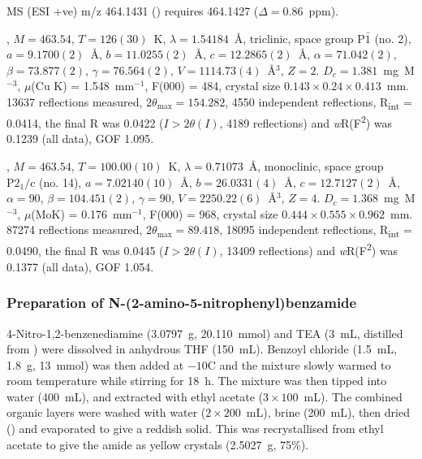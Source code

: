 \begin{refsection}
MS (ESI +ve) m/z 464.1431 ()  requires 464.1427 ($\Delta=0.86$~ppm).

, $M=463.54$, $T=126(30)$~K, $\lambda=1.54184$~\AA, triclinic, space group $\text{P}\bar{1}$ (no. 2), $a = 9.1700(2)$~\AA, $b = 11.0255(2)$~\AA, $c = 12.2865(2)$~\AA, $\alpha = 71.042(2)$\degree, $\beta = 73.877(2)$\degree, $\gamma = 76.564(2)$\degree, $V = 1114.73(4)$~\AA$^{3}$, $Z = 2$. $D_{c}= 1.381$~mg~M$^{-3}$, $\mu$(Cu K\a) = 1.548~mm$^{-1}$, F(000) = 484, crystal size $0.143 \times 0.24 \times 0.413$~mm. 13637 reflections measured, $2\theta_{\mathrm{max}}=154.282$\degree, 4550 independent reflections, R\textsubscript{int} = 0.0414, the final R was 0.0422 ($I > 2\theta(I)$, 4189 reflections) and \emph{w}R(F\textsuperscript{2}) was 0.1239 (all data), GOF 1.095. 

, $M=463.54$, $T=100.00(10)$~K, $\lambda=0.71073$~\AA, monoclinic, space group $\text{P}2_1/\text{c}$ (no. 14), $a = 7.02140(10)$~\AA, $b = 26.0331(4)$~\AA, $c = 12.7127(2)$~\AA, $\alpha = 90$\degree, $\beta = 104.451(2)$\degree, $\gamma = 90$\degree, $V = 2250.22(6)$~\AA$^{3}$, $Z = 4$. $D_{c}= 1.368$~mg~M$^{-3}$, $\mu$(MoK\a) = 0.176~mm$^{-1}$, F(000) = 968, crystal size $0.444 \times 0.555 \times 0.962$~mm. 87274 reflections measured, $2\theta_{\mathrm{max}}=89.418$\degree, 18095 independent reflections, R\textsubscript{int} = 0.0490, the final R was 0.0445 ($I > 2\theta(I)$, 13409 reflections) and \emph{w}R(F\textsuperscript{2}) was 0.1377 (all data), GOF 1.054. 

\subsubsection[Preparation of \refcmpd{rhs-nitro-amide}]{Preparation of N-(2-amino-5-nitrophenyl)benzamide }
4-Nitro-1,2-benzenediamine (3.0797~g, 20.110~mmol) and TEA (3~mL, distilled from ) were dissolved in anhydrous THF (150~mL).
Benzoyl chloride (1.5~mL, 1.8~g, 13~mmol) was then added at $-10$\degree{}C and the mixture slowly warmed to room temperature while stirring for 18~h.
The mixture was then tipped into water (400~mL), and extracted with ethyl acetate ($3\times100$~mL).
The combined organic layers were washed with water ($2\times200$~mL), brine (200~mL), then dried () and evaporated to give a reddish solid.
This was recrystallised from ethyl acetate to give the amide  as yellow crystals (2.5027~g, 75\%).\autocite{Patrick2017}


\end{refsection}
